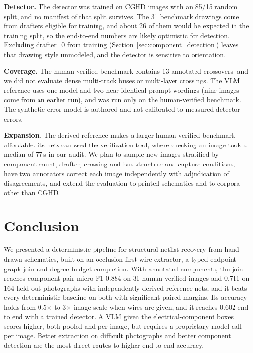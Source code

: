 \documentclass{ieeeaccess}
\begin{document}
\textbf{Detector.} The detector was trained on CGHD images with an 85/15 random split, and no manifest of that split survives. The 31 benchmark drawings come from drafters eligible for training, and about 26 of them would be expected in the training split, so the end-to-end numbers are likely optimistic for detection. Excluding drafter\_0 from training (Section~\ref{sec:component_detection}) leaves that drawing style unmodeled, and the detector is sensitive to orientation.

\textbf{Coverage.} The human-verified benchmark contains 13 annotated crossovers, and we did not evaluate dense multi-track buses or multi-layer crossings. The VLM reference uses one model and two near-identical prompt wordings (nine images come from an earlier run), and was run only on the human-verified benchmark. The synthetic error model is authored and not calibrated to measured detector errors.

\textbf{Expansion.} The derived reference makes a larger human-verified benchmark affordable: its nets can seed the verification tool, where checking an image took a median of 77\,s in our audit. We plan to sample new images stratified by component count, drafter, crossing and bus structure and capture conditions, have two annotators correct each image independently with adjudication of disagreements, and extend the evaluation to printed schematics and to corpora other than CGHD.

\section{Conclusion}

We presented a deterministic pipeline for structural netlist recovery from hand-drawn schematics, built on an occlusion-first wire extractor, a typed endpoint-graph join and degree-budget completion. With annotated components, the join reaches component-pair micro-F1 0.884 on 31 human-verified images and 0.711 on 164 held-out photographs with independently derived reference nets, and it beats every deterministic baseline on both with significant paired margins. Its accuracy holds from 0.5$\times$ to 3$\times$ image scale when wires are given, and it reaches 0.602 end to end with a trained detector. A VLM given the electrical-component boxes scores higher, both pooled and per image, but requires a proprietary model call per image. Better extraction on difficult photographs and better component detection are the most direct routes to higher end-to-end accuracy.
\end{document}
